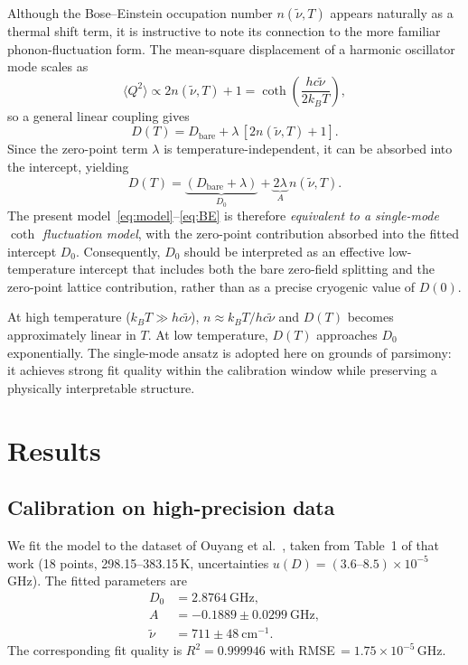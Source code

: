 \documentclass[12pt,a4paper]{article}
\begin{document}
Although the Bose--Einstein occupation number $n(\tilde{\nu},T)$
appears naturally as a thermal shift term, it is instructive to note
its connection to the more familiar phonon-fluctuation form.
The mean-square displacement of a harmonic oscillator mode scales as
%
\begin{equation}
    \langle Q^2 \rangle \propto 2n(\tilde{\nu},T)+1
    = \coth\!\left(\frac{hc\tilde{\nu}}{2k_BT}\right),
\end{equation}
%
so a general linear coupling gives
%
\begin{equation}
    D(T) = D_{\mathrm{bare}} + \lambda\,[2n(\tilde{\nu},T)+1].
\end{equation}
%
Since the zero-point term $\lambda$ is temperature-independent,
it can be absorbed into the intercept, yielding
%
\begin{equation}
    D(T) = \underbrace{(D_{\mathrm{bare}}+\lambda)}_{D_0}
           + \underbrace{2\lambda}_{A}\,n(\tilde{\nu},T).
\end{equation}
%
The present model~\eqref{eq:model}--\eqref{eq:BE} is therefore
\emph{equivalent to a single-mode $\coth$ fluctuation model},
with the zero-point contribution absorbed into the fitted intercept $D_0$.
Consequently, $D_0$ should be interpreted as an effective low-temperature
intercept that includes both the bare zero-field splitting and the
zero-point lattice contribution, rather than as a precise cryogenic
value of $D(0)$.

At high temperature ($k_BT \gg hc\tilde{\nu}$), $n \approx k_BT/hc\tilde{\nu}$
and $D(T)$ becomes approximately linear in $T$.
At low temperature, $D(T)$ approaches $D_0$ exponentially.
The single-mode ansatz is adopted here on grounds of parsimony: it achieves
strong fit quality within the calibration window while preserving a
physically interpretable structure.

\section{Results}

\subsection{Calibration on high-precision data}

We fit the model to the dataset of Ouyang et al.\ \cite{Ouyang2024},
taken from Table~1 of that work
(18 points, 298.15--383.15\,K, uncertainties
$u(D) = (3.6\text{--}8.5)\times10^{-5}$\,GHz).
The fitted parameters are
%
\begin{align}
    D_0    &= 2.8764\ \mathrm{GHz}, \\
    A      &= -0.1889 \pm 0.0299\ \mathrm{GHz}, \\
    \tilde{\nu} &= 711 \pm 48\ \mathrm{cm}^{-1}.
\end{align}
%
The corresponding fit quality is $R^2 = 0.999946$ with
RMSE\,$= 1.75\times10^{-5}$\,GHz.
\end{document}
